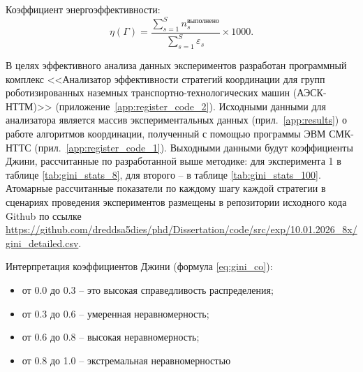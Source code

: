 Коэффициент энергоэффективности:
\begin{equation}
	\eta(\Gamma) = \frac{\displaystyle \sum_{s=1}^{S} n_s^{\text{выполнено}}}{\displaystyle \sum_{s=1}^{S} \varepsilon_s} \times 1000.
\end{equation}

В целях эффективного анализа данных экспериментов разработан программный комплекс <<Анализатор эффективности стратегий координации для групп роботизированных наземных транспортно-технологических машин (АЭСК-НТТМ)>> \cite{progbib2} (приложение~\ref{app:register_code_2}). Исходными данными для анализатора является массив экспериментальных данных (прил.\ \ref{app:results}) о работе алгоритмов координации, полученный с помощью программы ЭВМ СМК-НТТС (прил.\ \ref{app:register_code_1}). Выходными данными будут коэффициенты Джини, рассчитанные по разработанной выше методике: для эксперимента 1 в таблице \ref{tab:gini_stats_8}, для второго -- в таблице \ref{tab:gini_stats_100}. Атомарные рассчитанные показатели по каждому шагу каждой стратегии в сценариях проведения экспериментов размещены в репозитории исходного кода Github по ссылке \url{https://github.com/dreddsa5dies/phd/Dissertation/code/src/exp/10.01.2026_8x/gini_detailed.csv}.

Интерпретация коэффициентов Джини (формула \ref{eq:gini_co}):
\begin{itemize}[beginpenalty=10000, midpenalty=10000, wide=\parindent, leftmargin=0pt]
	\item от 0.0 до 0.3 -- это высокая справедливость распределения;
	\item от 0.3 до 0.6 -- умеренная неравномерность;
	\item от 0.6 до 0.8 -- высокая неравномерность;
	\item от 0.8 до 1.0 -- экстремальная неравномерностью
\end{itemize}

\begin{table}[htbp]
	\centering
	\caption{Коэффициенты Джини по средним значениям и медианам (выполненные задачи и потребленная энергия) для стратегий распределения задач. Эксперимент № 1}
	\label{tab:gini_stats_8}
\end{table}

